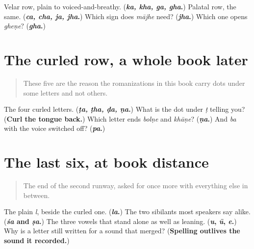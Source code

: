 \begin{tcolorbox}[breakable,colback=teal!4,colframe=teal!35!black,title={Before you move on}]
Velar row, plain to voiced-and-breathy. (\textbf{\emph{ka, kha, ga, gha}.}) Palatal row, the same. (\textbf{\emph{ca, cha, ja, jha}.}) Which sign does \emph{mājhe} need? (\textbf{\emph{jha}.}) Which one opens \emph{gheṇe}? (\textbf{\emph{gha}.})
\end{tcolorbox}
\section[curled row (vaḷlelī olī)]{The curled row, a whole book later}

\label{lesson:MR-R22-curled-r4}



\begin{quote}
These five are the reason the romanizations in this book carry dots under some letters and not others.
\end{quote}

\begin{tcolorbox}[breakable,colback=teal!4,colframe=teal!35!black,title={Before you move on}]
The four curled letters. (\textbf{\emph{ṭa, ṭha, ḍa, ṇa}.}) What is the dot under \emph{ṭ} telling you? (\textbf{Curl the tongue back.}) Which letter ends \emph{bolṇe} and \emph{khāṇe}? (\textbf{\emph{ṇa}.}) And \emph{ba} with the voice switched off? (\textbf{\emph{pa}.})
\end{tcolorbox}
\section[last six (śevaṭce sahā)]{The last six, at book distance}

\label{lesson:MR-R22-sibilants-r4}



\begin{quote}
The end of the second runway, asked for once more with everything else in between.
\end{quote}

\begin{tcolorbox}[breakable,colback=teal!4,colframe=teal!35!black,title={Before you move on}]
The plain \emph{l}, beside the curled one. (\textbf{\emph{la}.}) The two sibilants most speakers say alike. (\textbf{\emph{śa} and \emph{ṣa}.}) The three vowels that stand alone as well as leaning. (\textbf{\emph{u}, \emph{ū}, \emph{e}.}) Why is a letter still written for a sound that merged? (\textbf{Spelling outlives the sound it recorded.})
\end{tcolorbox}
